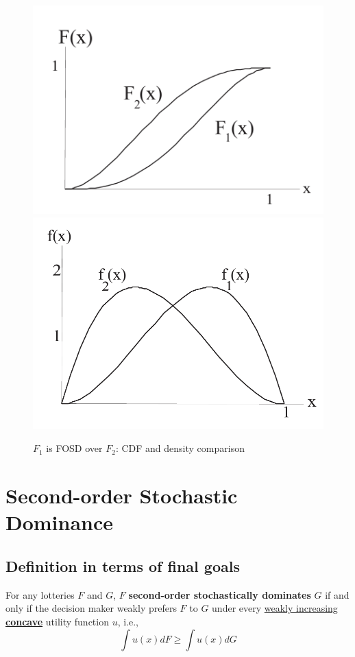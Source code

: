 \documentclass[11pt]{elegantbook}
\begin{document}
\begin{center}\begin{figure}[htbp]
    \centering
    \includegraphics[scale=0.2]{FOSD_1.png}
    \includegraphics[scale=0.2]{FOSD_2.png}
    \caption{$F_1$ is FOSD over $F_2$: CDF and density comparison}
    \label{}
\end{figure}\end{center}

\section{Second-order Stochastic Dominance}
\subsection{Definition in terms of final goals}
\begin{definition}
    \normalfont
    For any lotteries $F$ and $G$, $F$ \textbf{second-order stochastically dominates} $G$ if and only if the decision maker weakly prefers $F$ to $G$ under every \underline{weakly increasing \textbf{concave}} utility function $u$, i.e.,
    $$\int u (x) dF \geq \int u(x) dG$$
\end{definition}
\end{document}
